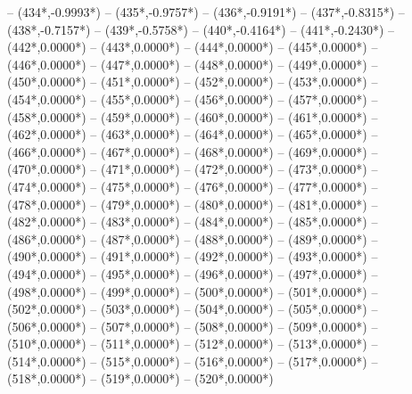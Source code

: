 {		-- ({434*\dx},{-0.9993*\dy})
		-- ({435*\dx},{-0.9757*\dy})
		-- ({436*\dx},{-0.9191*\dy})
		-- ({437*\dx},{-0.8315*\dy})
		-- ({438*\dx},{-0.7157*\dy})
		-- ({439*\dx},{-0.5758*\dy})
		-- ({440*\dx},{-0.4164*\dy})
		-- ({441*\dx},{-0.2430*\dy})
		-- ({442*\dx},{0.0000*\dy})
		-- ({443*\dx},{0.0000*\dy})
		-- ({444*\dx},{0.0000*\dy})
		-- ({445*\dx},{0.0000*\dy})
		-- ({446*\dx},{0.0000*\dy})
		-- ({447*\dx},{0.0000*\dy})
		-- ({448*\dx},{0.0000*\dy})
		-- ({449*\dx},{0.0000*\dy})
		-- ({450*\dx},{0.0000*\dy})
		-- ({451*\dx},{0.0000*\dy})
		-- ({452*\dx},{0.0000*\dy})
		-- ({453*\dx},{0.0000*\dy})
		-- ({454*\dx},{0.0000*\dy})
		-- ({455*\dx},{0.0000*\dy})
		-- ({456*\dx},{0.0000*\dy})
		-- ({457*\dx},{0.0000*\dy})
		-- ({458*\dx},{0.0000*\dy})
		-- ({459*\dx},{0.0000*\dy})
		-- ({460*\dx},{0.0000*\dy})
		-- ({461*\dx},{0.0000*\dy})
		-- ({462*\dx},{0.0000*\dy})
		-- ({463*\dx},{0.0000*\dy})
		-- ({464*\dx},{0.0000*\dy})
		-- ({465*\dx},{0.0000*\dy})
		-- ({466*\dx},{0.0000*\dy})
		-- ({467*\dx},{0.0000*\dy})
		-- ({468*\dx},{0.0000*\dy})
		-- ({469*\dx},{0.0000*\dy})
		-- ({470*\dx},{0.0000*\dy})
		-- ({471*\dx},{0.0000*\dy})
		-- ({472*\dx},{0.0000*\dy})
		-- ({473*\dx},{0.0000*\dy})
		-- ({474*\dx},{0.0000*\dy})
		-- ({475*\dx},{0.0000*\dy})
		-- ({476*\dx},{0.0000*\dy})
		-- ({477*\dx},{0.0000*\dy})
		-- ({478*\dx},{0.0000*\dy})
		-- ({479*\dx},{0.0000*\dy})
		-- ({480*\dx},{0.0000*\dy})
		-- ({481*\dx},{0.0000*\dy})
		-- ({482*\dx},{0.0000*\dy})
		-- ({483*\dx},{0.0000*\dy})
		-- ({484*\dx},{0.0000*\dy})
		-- ({485*\dx},{0.0000*\dy})
		-- ({486*\dx},{0.0000*\dy})
		-- ({487*\dx},{0.0000*\dy})
		-- ({488*\dx},{0.0000*\dy})
		-- ({489*\dx},{0.0000*\dy})
		-- ({490*\dx},{0.0000*\dy})
		-- ({491*\dx},{0.0000*\dy})
		-- ({492*\dx},{0.0000*\dy})
		-- ({493*\dx},{0.0000*\dy})
		-- ({494*\dx},{0.0000*\dy})
		-- ({495*\dx},{0.0000*\dy})
		-- ({496*\dx},{0.0000*\dy})
		-- ({497*\dx},{0.0000*\dy})
		-- ({498*\dx},{0.0000*\dy})
		-- ({499*\dx},{0.0000*\dy})
		-- ({500*\dx},{0.0000*\dy})
		-- ({501*\dx},{0.0000*\dy})
		-- ({502*\dx},{0.0000*\dy})
		-- ({503*\dx},{0.0000*\dy})
		-- ({504*\dx},{0.0000*\dy})
		-- ({505*\dx},{0.0000*\dy})
		-- ({506*\dx},{0.0000*\dy})
		-- ({507*\dx},{0.0000*\dy})
		-- ({508*\dx},{0.0000*\dy})
		-- ({509*\dx},{0.0000*\dy})
		-- ({510*\dx},{0.0000*\dy})
		-- ({511*\dx},{0.0000*\dy})
		-- ({512*\dx},{0.0000*\dy})
		-- ({513*\dx},{0.0000*\dy})
		-- ({514*\dx},{0.0000*\dy})
		-- ({515*\dx},{0.0000*\dy})
		-- ({516*\dx},{0.0000*\dy})
		-- ({517*\dx},{0.0000*\dy})
		-- ({518*\dx},{0.0000*\dy})
		-- ({519*\dx},{0.0000*\dy})
		-- ({520*\dx},{0.0000*\dy})
}
